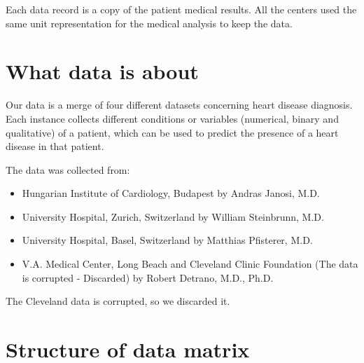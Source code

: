 \documentclass[a4paper,12pt]{article}
\begin{document}
    Each data record is a copy of the patient medical results. All the centers used the same unit representation for the medical analysis to keep the data.

\section{What data is about}

    Our data is a merge of four different datasets concerning heart disease diagnosis.
    Each instance collects different conditions or variables (numerical, binary and qualitative) of a patient,
    which can be used to predict the presence of a heart disease in that patient.
    
    The data was collected from:

    \begin{itemize}

        \item Hungarian Institute of Cardiology, Budapest by Andras Janosi, M.D.
        \item University Hospital, Zurich, Switzerland by William Steinbrunn, M.D.
        \item University Hospital, Basel, Switzerland by Matthias Pfisterer, M.D.
        \item V.A. Medical Center, Long Beach and Cleveland Clinic Foundation (The data is corrupted - Discarded) by Robert Detrano, M.D., Ph.D.

    \end{itemize}

    The Cleveland data is corrupted, so we discarded it.

\section{Structure of data matrix}
\end{document}
